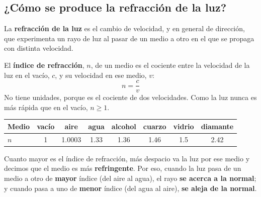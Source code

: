 \subsection{¿Cómo se produce la refracción de la luz?}

La \textbf{refracción de la luz} es el cambio de velocidad, y en general de dirección, que experimenta un rayo de luz al pasar de un medio a otro en el que se propaga con distinta velocidad.

\begin{definition}
    El \textbf{índice de refracción}, \(n\), de un medio es el cociente entre la velocidad de la luz en el vacío, \(c\), y su velocidad en ese medio, \(v\):
    \[ n = \frac{c}{v} \]
    No tiene unidades, porque es el cociente de dos velocidades. Como la luz nunca es más rápida que en el vacío, \(n \geq 1\).
\end{definition}

\begin{center}
    {\small
    \begin{tabular}{@{}lccccccc@{}}
        \toprule
        \textbf{Medio} & \textbf{vacío} & \textbf{aire} & \textbf{agua} & \textbf{alcohol} & \textbf{cuarzo} & \textbf{vidrio} & \textbf{diamante} \\
        \midrule
        \textbf{\(n\)} & 1 & \num{1.0003} & \num{1.33} & \num{1.36} & \num{1.46} & \num{1.5} & \num{2.42} \\
        \bottomrule
    \end{tabular}
    }
\end{center}

Cuanto mayor es el índice de refracción, más despacio va la luz por ese medio y decimos que el medio es más \textbf{refringente}. Por eso, cuando la luz pasa de un medio a otro de \textbf{mayor} índice (del aire al agua), el rayo \textbf{se acerca a la normal}; y cuando pasa a uno de \textbf{menor} índice (del agua al aire), \textbf{se aleja de la normal}.

